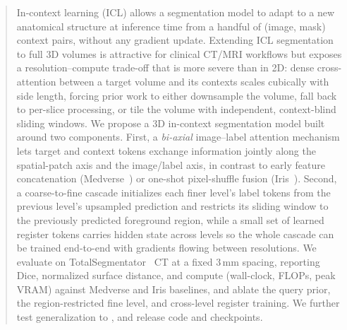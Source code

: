 \begin{abstract}
In-context learning (ICL) allows a segmentation model to adapt to a new
anatomical structure at inference time from a handful of (image, mask)
context pairs, without any gradient update. Extending ICL segmentation to
full 3D volumes is attractive for clinical CT/MRI workflows but exposes a
resolution--compute trade-off that is more severe than in 2D: dense
cross-attention between a target volume and its contexts scales cubically
with side length, forcing prior work to either downsample the volume,
fall back to per-slice processing, or tile the volume with independent,
context-blind sliding windows. We propose a 3D in-context segmentation
model built around two components. First, a
\emph{bi-axial} image--label attention mechanism lets target and context
tokens exchange information jointly along the spatial-patch axis and the
image/label axis, in contrast to early feature concatenation
(Medverse~\cite{huMedverseUniversalModel2025a}) or one-shot
pixel-shuffle fusion (Iris~\cite{gaoShowSegmentUniversal2025}). Second, a
coarse-to-fine cascade initializes each finer level's label tokens from
the previous level's upsampled prediction and restricts its sliding
window to the previously predicted foreground region, while a small set
of learned register tokens carries hidden state across levels so the
whole cascade can be trained end-to-end with gradients flowing between
resolutions. We evaluate on TotalSegmentator~\cite{wasserthalTotalSegmentatorRobustSegmentation2023}
CT at a fixed 3\,mm spacing, reporting Dice, normalized surface distance,
and compute (wall-clock, FLOPs, peak VRAM) against Medverse and Iris
baselines, and ablate the query prior, the region-restricted fine level,
and cross-level register training.  We further test generalization to , and release code and checkpoints.
\end{abstract}
